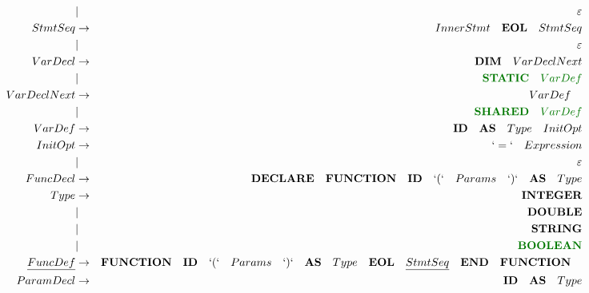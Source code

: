 \documentclass[a4paper,11pt,landscape,leqno]{article}
\begin{document}
\begin{eqnarray}
            &       |           & \varepsilon \\
StmtSeq     &    \rightarrow    & InnerStmt\quad \textbf{EOL}\quad StmtSeq   \\
            &       |           & \varepsilon \\
VarDecl     & \rightarrow       & \textbf{DIM}\quad VarDeclNext \\
            &       |           & \textcolor{green1}{\textbf{STATIC}\quad VarDef} \\
VarDeclNext &   \rightarrow     & VarDef\quad \\
            &       |           & \textcolor{green1}{\textbf{SHARED}\quad VarDef} \\
VarDef      & \rightarrow       & \textbf{ID}\quad \textbf{AS}\quad Type \quad InitOpt\\
InitOpt     &      \rightarrow  & `=`\quad Expression \\
            &       |           & \varepsilon \\
FuncDecl    &  \rightarrow      & \textbf{DECLARE}\quad \textbf{FUNCTION}\quad \textbf{ID}\quad `(` \quad Params \quad`)`\quad \textbf{AS}\quad Type   \\
Type        &    \rightarrow    &    \textbf{INTEGER}    \\
            &       |           & \textbf{DOUBLE}   \\
            &       |           & \textbf{STRING}   \\
            &       |           & \textcolor{green1}{\textbf{BOOLEAN}}  \\
    \underline{FuncDef}    &    \rightarrow    & \textbf{FUNCTION}\quad \textbf{ID}\quad `(`\quad Params\quad `)`\quad \textbf{AS}\quad Type\quad \textbf{EOL}\quad \underline{StmtSeq}\quad \textbf{END}\quad \textbf{FUNCTION}\quad \\
ParamDecl   &   \rightarrow   & {\textbf{ID}\quad \textbf{AS}\quad Type}    \\

\end{eqnarray}
\end{document}
